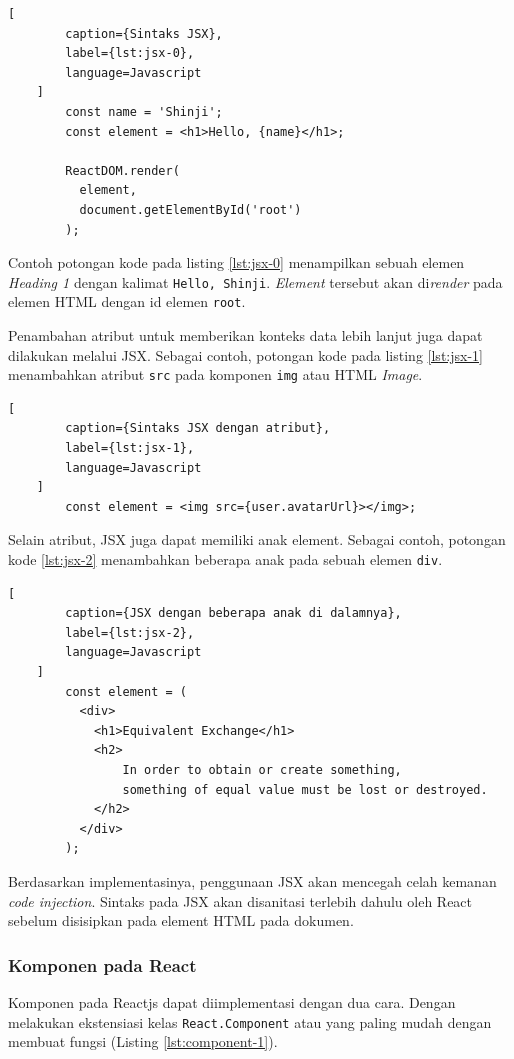    \begin{lstlisting}[
        caption={Sintaks JSX}, 
        label={lst:jsx-0}, 
        language=Javascript
    ]
        const name = 'Shinji';
        const element = <h1>Hello, {name}</h1>;
        
        ReactDOM.render(
          element,
          document.getElementById('root')
        );
    \end{lstlisting}
    
    Contoh potongan kode pada listing \ref{lst:jsx-0} menampilkan sebuah elemen
    \textit{Heading 1} dengan kalimat \texttt{Hello, Shinji}. \textit{Element}
    tersebut akan di\textit{render} pada elemen HTML dengan id elemen
    \texttt{root}.
    
    Penambahan atribut untuk memberikan konteks data lebih lanjut juga dapat
    dilakukan melalui JSX. Sebagai contoh, potongan kode pada listing
    \ref{lst:jsx-1} menambahkan atribut \texttt{src} pada komponen \texttt{img}
    atau HTML \textit{Image}.
    
    \begin{lstlisting}[
        caption={Sintaks JSX dengan atribut}, 
        label={lst:jsx-1}, 
        language=Javascript
    ]
        const element = <img src={user.avatarUrl}></img>;
    \end{lstlisting}
    
        
    Selain atribut, JSX juga dapat memiliki anak element. Sebagai contoh,
    potongan kode \ref{lst:jsx-2} menambahkan beberapa anak pada sebuah elemen
    \texttt{div}.
    \begin{lstlisting}[
        caption={JSX dengan beberapa anak di dalamnya}, 
        label={lst:jsx-2}, 
        language=Javascript
    ]
        const element = (
          <div>
            <h1>Equivalent Exchange</h1>
            <h2>
                In order to obtain or create something,
                something of equal value must be lost or destroyed.
            </h2>
          </div>
        );
    \end{lstlisting}
    
    Berdasarkan implementasinya, penggunaan JSX akan mencegah celah kemanan
    \textit{code injection}. Sintaks pada JSX akan disanitasi terlebih dahulu
    oleh React sebelum disisipkan pada element HTML pada dokumen.
    
    \subsubsection{Komponen pada React}
    Komponen pada Reactjs dapat diimplementasi dengan dua cara. Dengan melakukan
    ekstensiasi kelas \texttt{React.Component} atau yang paling mudah dengan
    membuat fungsi (Listing \ref{lst:component-1}).
    
